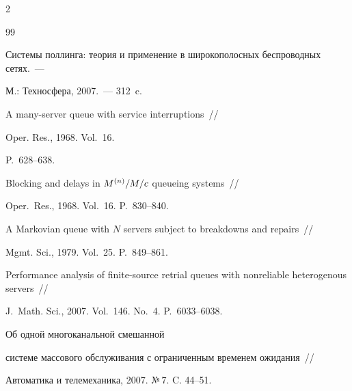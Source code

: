 \begin{multicols}{2}
{{\begin{thebibliography}{99}


Системы поллинга: теория и применение в широкополосных беспроводных сетях.~---


М.: Техносфера, 2007.~--- 312~c.









A many-server queue with service interruptions~//


Oper. Res., 1968. Vol.~16.\linebreak


 P.~628--638.









Blocking and delays in $M\hphantom{}^{(n)}/M/c$ queueing systems~//


Oper.\ Res., 1968. Vol.~16. P.~830--840.









A Markovian queue with $N$ servers subject to breakdowns and repairs~//


Mgmt. Sci., 1979. Vol.~25. P.~849--861.









Performance analysis of finite-source retrial queues with nonreliable heterogenous servers~//


J.~Math. Sci., 2007. Vol.~146. No.~4. P.~6033--6038.









Об одной многоканальной смешанной


системе массового обслуживания с ограниченным временем ожидания~//


Автоматика и телемеханика, 2007. №\,7. C. 44--51.






\end{thebibliography}}}
\end{multicols}
